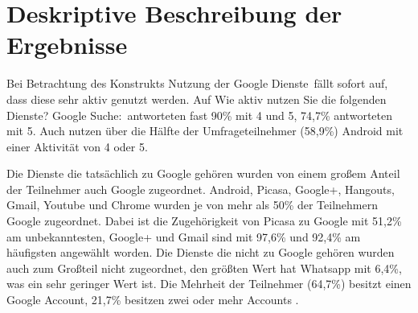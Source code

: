 \section{Deskriptive Beschreibung der Ergebnisse}

Bei Betrachtung des Konstrukts \glqq Nutzung der Google Dienste\grqq\ fällt sofort auf, dass diese sehr aktiv genutzt werden. Auf \glqq Wie aktiv nutzen Sie die folgenden Dienste? Google Suche:\grqq\ antworteten fast 90\% mit 4 und 5, 74,7\% antworteten mit 5. Auch nutzen über die Hälfte der Umfrageteilnehmer (58,9\%) Android mit einer Aktivität von 4 oder 5.

Die Dienste die tatsächlich zu Google gehören wurden von einem großem Anteil der Teilnehmer auch Google zugeordnet. Android, Picasa, Google+, Hangouts, Gmail, Youtube und Chrome wurden je von mehr als 50\% der Teilnehmern Google zugeordnet. Dabei ist die Zugehörigkeit von Picasa zu Google mit 51,2\% am unbekanntesten, Google+ und Gmail sind mit 97,6\% und 92,4\% am häufigsten angewählt worden. Die Dienste die nicht zu Google gehören wurden auch zum Großteil nicht zugeordnet, den größten Wert hat Whatsapp mit 6,4\%, was ein sehr geringer Wert ist.
Die Mehrheit der Teilnehmer (64,7\%) besitzt einen Google Account, 21,7\% besitzen zwei oder mehr Accounts .

